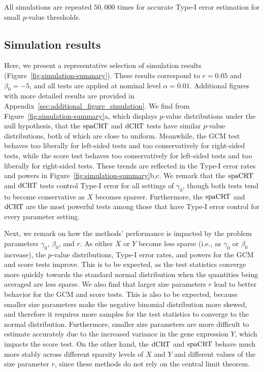 \documentclass[12pt]{article}
\theoremstyle{definition}
\newcommand{\srx}{X}									%
\newcommand{\sry}{Y}									%
\newcommand{\dCRT}{\textnormal{dCRT}} 					%
\newcommand{\spacrt}{\textnormal{spaCRT}}               %
\begin{document}
All simulations are repeated $50,000$ times for accurate Type-I error estimation for small $p$-value thresholds.

\subsection{Simulation results}

Here, we present a representative selection of simulation results (Figure~\ref{fig:simulation-summary}). These results correspond to $r = 0.05$ and $\beta_0 = -5$, and all tests are applied at nominal level $\alpha = 0.01$. Additional figures with more detailed results are provided in Appendix~\ref{sec:additional_figure_simulation}. We find from Figure~\ref{fig:simulation-summary}a, which displays $p$-value distributions under the null hypothesis, that the $\spacrt$ and $\dCRT$ tests have similar $p$-value distributions, both of which are close to uniform. Meanwhile, the GCM test behaves too liberally for left-sided tests and too conservatively for right-sided tests, while the score test behaves too conservatively for left-sided tests and too liberally for right-sided tests. These trends are reflected in the Type-I error rates and powers in Figure~\ref{fig:simulation-summary}b,c. We remark that the $\spacrt$ and $\dCRT$ tests control Type-I error for all settings of $\gamma_0$, though both tests tend to become conservative as $\srx$ becomes sparser. Furthermore, the $\spacrt$ and $\dCRT$ are the most powerful tests among those that have Type-I error control for every parameter setting.

Next, we remark on how the methods' performance is impacted by the problem parameters $\gamma_0$, $\beta_0$, and $r$. As either $\srx$ or $\sry$ become less sparse (i.e., as $\gamma_0$ or $\beta_0$ increase), the $p$-value distributions, Type-I error rates, and powers for the GCM and score tests improve. This is to be expected, {\color{red} as the test statistics converge more quickly towards the standard normal distribution} when the quantities being averaged are less sparse. We also find that larger size parameters $r$ lead to better behavior for the GCM and score tests. This is also to be expected, because smaller size parameters make the negative binomial distribution more skewed, {\color{red} and therefore it requires more samples for the test statistics to converge to the normal distribution.} Furthermore, smaller size parameters are more difficult to estimate accurately due to the increased variance in the gene expression $\sry$, which impacts the score test. On the other hand, the $\dCRT$ and $\spacrt$ behave much more stably across different sparsity levels of $\srx$ and $\sry$ and different values of the size parameter $r$, since these methods do not rely on the central limit theorem. 
\end{document}
